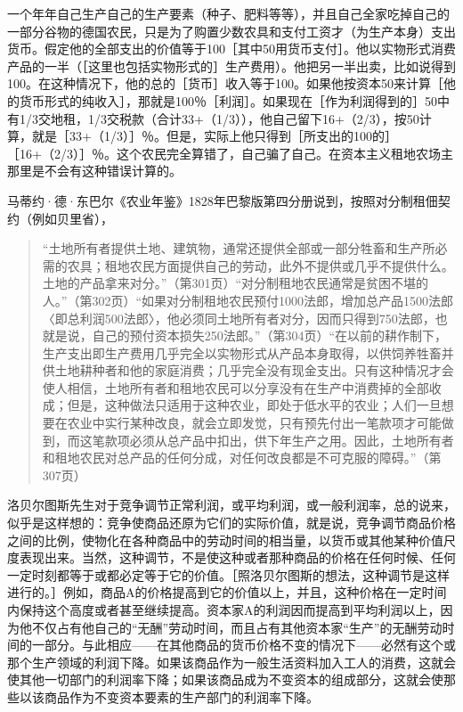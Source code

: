 一个年年自己生产自己的生产要素（种子、肥料等等），并且自己全家吃掉自己的一部分谷物的德国农民，只是为了购置少数农具和支付工资才（为生产本身）支出货币。假定他的全部支出的价值等于100［其中50用货币支付］。他以实物形式消费产品的一半（［这里也包括实物形式的］生产费用）。他把另一半出卖，比如说得到100。在这种情况下，他的总的［货币］收入等于100。如果他按资本50来计算［他的货币形式的纯收入］，那就是100％［利润］。如果现在［作为利润得到的］50中有1/3交地租，1/3交税款（合计33+（1/3）），他自己留下16+（2/3），按50计算，就是［33+（1/3）］％。但是，实际上他只得到［所支出的100的］［16+（2/3）］％。这个农民完全算错了，自己骗了自己。在资本主义租地农场主那里是不会有这种错误计算的。

马蒂约·德·东巴尔《农业年鉴》1828年巴黎版第四分册说到，按照对分制租佃契约（例如贝里省），

\begin{quote}{“土地所有者提供土地、建筑物，通常还提供全部或一部分牲畜和生产所必需的农具；租地农民方面提供自己的劳动，此外不提供或几乎不提供什么。土地的产品拿来对分。”（第301页）“对分制租地农民通常是贫困不堪的人。”（第302页）“如果对分制租地农民预付1000法郎，增加总产品1500法郎〈即总利润500法郎〉，他必须同土地所有者对分，因而只得到750法郎，也就是说，自己的预付资本损失250法郎。”（第304页）“在以前的耕作制下，生产支出即生产费用几乎完全以实物形式从产品本身取得，以供饲养牲畜并供土地耕种者和他的家庭消费；几乎完全没有现金支出。只有这种情况才会使人相信，土地所有者和租地农民可以分享没有在生产中消费掉的全部收成；但是，这种做法只适用于这种农业，即处于低水平的农业；人们一旦想要在农业中实行某种改良，就会立即发觉，只有预先付出一笔款项才可能做到，而这笔款项必须从总产品中扣出，供下年生产之用。因此，土地所有者和租地农民对总产品的任何分成，对任何改良都是不可克服的障碍。”（第307页）}\end{quote}



洛贝尔图斯先生对于竞争调节正常利润，或平均利润，或一般利润率，总的说来，似乎是这样想的：竞争使商品还原为它们的实际价值，就是说，竞争调节商品价格之间的比例，使物化在各种商品中的劳动时间的相当量，以货币或其他某种价值尺度表现出来。当然，这种调节，不是使这种或者那种商品的价格在任何时候、任何一定时刻都等于或都必定等于它的价值。［照洛贝尔图斯的想法，这种调节是这样进行的。］例如，商品A的价格提高到它的价值以上，并且，这种价格在一定时间内保持这个高度或者甚至继续提高。资本家A的利润因而提高到平均利润以上，因为他不仅占有他自己的“无酬”劳动时间，而且占有其他资本家“生产”的无酬劳动时间的一部分。与此相应——在其他商品的货币价格不变的情况下——必然有这个或那个生产领域的利润下降。如果该商品作为一般生活资料加入工人的消费，这就会使其他一切部门的利润率下降；如果该商品成为不变资本的组成部分，这就会使那些以该商品作为不变资本要素的生产部门的利润率下降。

